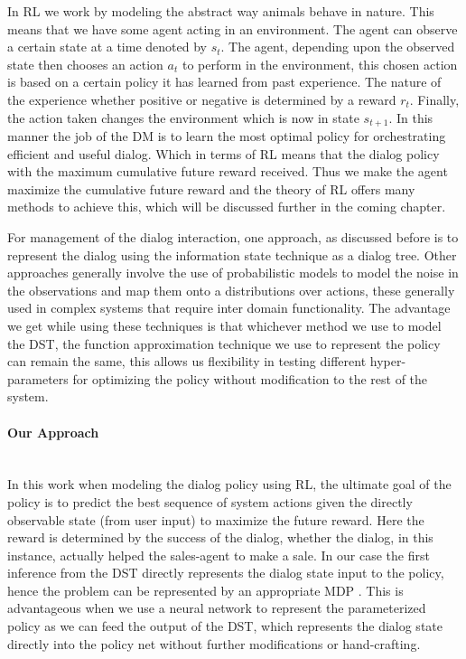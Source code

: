 \documentclass[14pt]{extarticle}
\newcommand{\myparagraph}[1]{\paragraph{#1}\mbox{}\\ \linebreak}
\numberwithin{equation}{section}
\begin{document}
	In RL we work by modeling the abstract way animals behave in nature. This means that we have some agent acting in an environment. The agent can observe a certain state at a time denoted by $s_t$. The agent, depending upon the observed state then chooses an action $a_t$ to perform in the environment, this chosen action is based on a certain policy it has learned from past experience. The nature of the experience whether positive or negative is determined by a reward $r_t$. Finally, the action taken changes the environment which is now in state $s_{t+1}$. In this manner the job of the DM is to learn the most optimal policy for orchestrating efficient and useful dialog. Which in terms of RL means that the dialog policy with the maximum cumulative future reward received. Thus we make the agent maximize the cumulative future reward and the theory of RL \cite{Sutton-introRL} offers many methods to achieve this\cite{DBLP:journals/corr/abs-1711-01731}, which will be discussed further in the coming chapter. \par
	For management of the dialog interaction, one approach, as discussed before is to represent the dialog using the information state technique as a dialog tree. Other approaches generally involve the use of probabilistic models to model the noise in the observations and map them onto a distributions over actions, these generally used in complex systems that require inter domain functionality\cite{henderson_interdomain}. The advantage we get while using these techniques is that whichever method we use to model the DST, the function approximation technique we use to represent the policy can remain the same, this allows us flexibility in testing different hyper-parameters for optimizing the policy without modification to the rest of the system.
	\myparagraph{Our Approach}
	In this work when modeling the dialog policy using RL, the ultimate goal of the policy is to predict the best sequence of system actions given the directly observable state (from user input) to maximize the future reward.
	Here the reward is determined by the success of the dialog, whether the dialog, in this instance, actually helped the sales-agent to make a sale. In our case the first inference from the DST directly represents the dialog state input to the policy, hence the problem can be represented by an appropriate MDP \cite{mdp-pieraccini}. This is advantageous when we use a neural network to represent the parameterized policy as we can feed the output of the DST, which represents the dialog state directly into the policy net without further modifications or hand-crafting.
\end{document}
